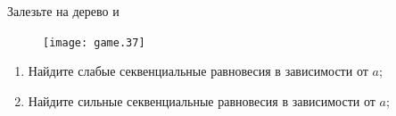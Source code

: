 \begin{problem}
\begin{source}
\cite[9.C.3]{colell:mt}
\end{source}
Залезьте на дерево и

\begin{figure}[htbp]
     \texttt{[image: game.37]}
\end{figure}

\begin{enumerate}
\item Найдите слабые секвенциальные равновесия в зависимости от  $a$;\par
\item Найдите сильные секвенциальные равновесия в зависимости от  $a$;
\end{enumerate}


\begin{sol}

\end{sol}
\end{problem}







